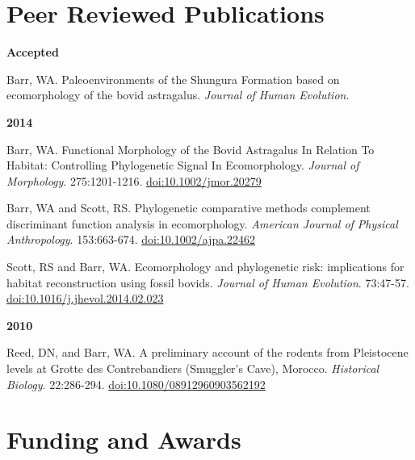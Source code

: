 \documentclass{article}
\begin{document}
\section*{Peer Reviewed Publications}

\begin{description*}
\item[] {\bfseries Accepted}
\item[] Barr, WA. Paleoenvironments of the Shungura Formation based on ecomorphology of the bovid astragalus. \emph{Journal of Human Evolution}.
\end{description*}


\begin{description*}
\item[] {\bfseries 2014}
\item[] Barr, WA. Functional Morphology of the Bovid Astragalus In Relation To Habitat: Controlling Phylogenetic Signal In Ecomorphology. \emph{Journal
of Morphology}. 275:1201-1216. \href{http://dx.doi.org/10.1002/jmor.20279}{doi:10.1002/jmor.20279}

\item[] Barr, WA and Scott, RS. Phylogenetic comparative methods complement discriminant function analysis in ecomorphology. \emph{American Journal
of Physical Anthropology}. 153:663-674. \href{http://dx.doi.org/10.1002/ajpa.22462}{doi:10.1002/ajpa.22462}

\item[] Scott, RS and Barr, WA. Ecomorphology and phylogenetic risk: implications for habitat reconstruction using fossil bovids.
\emph{Journal of Human Evolution}. 73:47-57. \href{http://dx.doi.org/10.1016/j.jhevol.2014.02.023}{doi:10.1016/j.jhevol.2014.02.023}

\end{description*}

\begin{description*}
\item[] {\bfseries 2010}
\item[] Reed, DN, and Barr, WA. A preliminary account of the rodents from Pleistocene levels at Grotte des Contrebandiers (Smuggler's Cave),
Morocco. \emph{Historical Biology}. 22:286-294. \href{http://dx.doi.org/10.1080/08912960903562192}{doi:10.1080/08912960903562192}
\end{description*}
\section*{Funding and Awards}
\end{document}
